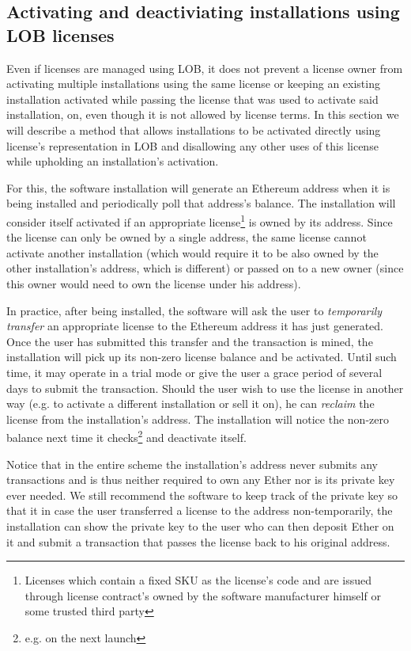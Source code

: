 \documentclass[a4paper]{article}
\begin{document}
\subsection{Activating and deactiviating installations using LOB licenses}
\label{ch:installationActivation}

Even if licenses are managed using LOB, it does not prevent a license owner from activating multiple installations using the same license or keeping an existing installation activated while passing the license that was used to activate said installation, on, even though it is not allowed by license terms. In this section we will describe a method that allows installations to be activated directly using license's representation in LOB and disallowing any other uses of this license while upholding an installation's activation.

For this, the software installation will generate an Ethereum address when it is being installed and periodically poll that address's balance. The installation will consider itself activated if an appropriate license\footnote{Licenses which contain a fixed SKU as the license's code and are issued through license contract's owned by the software manufacturer himself or some trusted third party} is owned by its address. Since the license can only be owned by a single address, the same license cannot activate another installation (which would require it to be also owned by the other installation's address, which is different) or passed on to a new owner (since this owner would need to own the license under his address).

In practice, after being installed, the software will ask the user to \emph{temporarily transfer} an appropriate license to the Ethereum address it has just generated. Once the user has submitted this transfer and the transaction is mined, the installation will pick up its non-zero license balance and be activated. Until such time, it may operate in a trial mode or give the user a grace period of several days to submit the transaction. Should the user wish to use the license in another way (e.g. to activate a different installation or sell it on), he can \emph{reclaim} the license from the installation's address. The installation will notice the non-zero balance next time it checks\footnote{e.g. on the next launch} and deactivate itself.

Notice that in the entire scheme the installation's address never submits any transactions and is thus neither required to own any Ether nor is its private key ever needed. We still recommend the software to keep track of the private key so that it in case the user transferred a license to the address non-temporarily, the installation can show the private key to the user who can then deposit Ether on it and submit a transaction that passes the license back to his original address.
\end{document}
